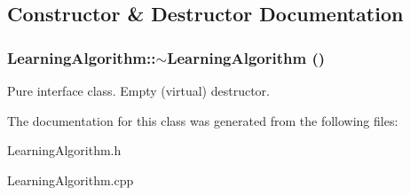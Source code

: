 \subsection{Constructor \& Destructor Documentation}
\hypertarget{classLearningAlgorithm_a0ec630ac5340988eea92b8ede9a4422d}{
\subsubsection[{$\sim$LearningAlgorithm}]{\setlength{\rightskip}{0pt plus 5cm}LearningAlgorithm::$\sim$LearningAlgorithm ()}}
\label{classLearningAlgorithm_a0ec630ac5340988eea92b8ede9a4422d}
Pure interface class. Empty (virtual) destructor. 

The documentation for this class was generated from the following files:\begin{DoxyCompactItemize}
\item 
LearningAlgorithm.h\item 
LearningAlgorithm.cpp\end{DoxyCompactItemize}
